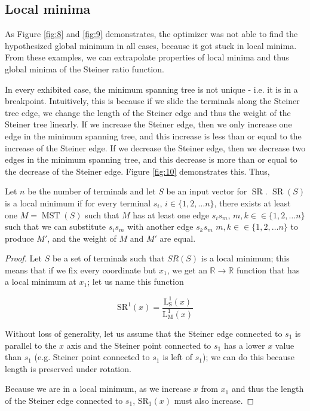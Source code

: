 \documentclass{mpaper}
\begin{document}
\subsection{Local minima}

As Figure \ref{fig:8} and \ref{fig:9} demonstrates, the optimizer was not able to find the hypothesized global minimum in all cases, because it got stuck in local minima. From these examples, we can extrapolate properties of local minima and thus global minima of the Steiner ratio function.

In every exhibited case, the minimum spanning tree is not unique - i.e. it is in a breakpoint. Intuitively, this is because if we slide the terminals along the Steiner tree edge, we change the length of the Steiner edge and thus the weight of the Steiner tree linearly. If we increase the Steiner edge, then we only increase one edge in the minimum spanning tree, and this increase is less than or equal to the increase of the Steiner edge. If we decrease the Steiner edge, then we decrease two edges in the minimum spanning tree, and this decrease is more than or equal to the decrease of the Steiner edge. Figure \ref{fig:10} demonstrates this. Thus, 

\begin{lemma}
  \label{c:1}
  Let $n$ be the number of terminals and let $S$ be an input vector for $\operatorname{SR}$. $\operatorname{SR}(S)$ is a local minimum if for every terminal $s_i$, $i\in\{1,2,\dots n\}$, there exists at least one $M=\operatorname{MST}(S)$ such that $M$ has at least one edge $s_is_m$, $m, k\in \in\{1,2,\dots n\}$ such that we can substitute $s_is_m$ with another edge $s_ks_m$  $m, k\in \in\{1,2,\dots n\}$ to produce $M'$, and the weight of $M$ and $M'$ are equal.
\end{lemma}
\begin{proof}
  Let $S$ be a set of terminals such that $SR(S)$ is a local minimum; this means that if we fix every coordinate but $x_1$, we get an $\mathbb{R}\rightarrow \mathbb{R}$ function that has a local minimum at $x_1$; let us name this function 
  
  $$\operatorname{SR^1}(x)=\frac{\operatorname{L_S^1}(x)}{\operatorname{L_M^1}(x)}$$
  
  Without loss of generality, let us assume that the Steiner edge connected to $s_1$ is parallel to the $x$ axis and the Steiner point connected to $s_1$ has a lower $x$ value than $s_1$ (e.g. Steiner point connected to $s_1$ is left of $s_1$); we can do this because length is preserved under rotation. 

  Because we are in a local minimum, as we increase $x$ from $x_1$ and thus the length of the Steiner edge connected to $s_1$, $\operatorname{SR_1}(x)$ must also increase.
\end{proof}
\end{document}
